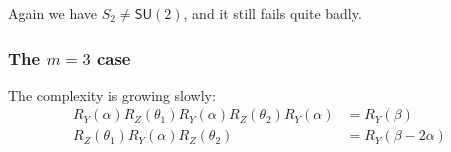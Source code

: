 \documentclass[12pt,dvipsnames]{article}
\newcommand{\SU}[1]{\mathsf{SU} (#1)}
\newcommand{\1}{\mathbb{1}}
\theoremstyle{plain}
\begin{document}
Again we have $S_2\neq \SU{2}$, and it still fails quite badly.

\subsubsection{The $m = 3$ case}
The complexity is growing slowly:
\begin{align*}
    R_Y(\alpha)R_Z(\theta_1)R_Y(\alpha)R_Z(\theta_2)R_Y(\alpha) & = R_Y(\beta)           \\
    R_Z(\theta_1)R_Y(\alpha)R_Z(\theta_2)                       & = R_Y(\beta - 2\alpha)
\end{align*}
\end{document}
